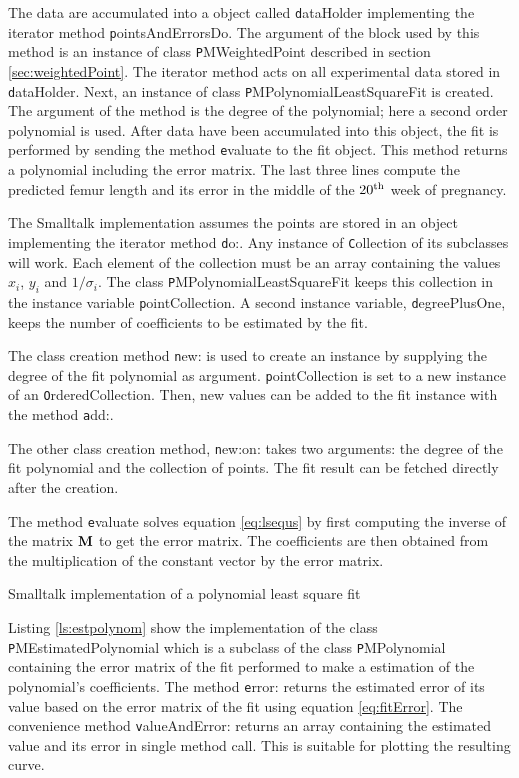 The data are accumulated into a object called {\texttt dataHolder}
implementing the iterator method {\texttt pointsAndErrorsDo}. The
argument of the block used by this method is an instance of class
{\texttt PMWeightedPoint} described in section
\ref{sec:weightedPoint}. The iterator method acts on all
experimental data stored in {\texttt dataHolder}. Next, an instance of
class {\texttt PMPolynomialLeastSquareFit} is created. The argument
of the method is the degree of the polynomial; here a second order
polynomial is used. After data have been accumulated into this
object, the fit is performed by sending the method {\texttt evaluate}
to the fit object. This method returns a polynomial including the
error matrix. The last three lines compute the predicted femur
length and its error in the middle of the $20^{\mathop{\textrm{th}}}$ week of
pregnancy.

The Smalltalk implementation assumes the points are stored in an
object implementing the iterator method {\texttt do:}.
Any instance of
{\texttt Collection} of its subclasses will work. Each element of the
collection must be an array containing the values $x_i$, $y_i$ and
$1/\sigma_i$.
The class {\texttt PMPolynomialLeastSquareFit} keeps
this collection in the instance variable {\texttt pointCollection}. A
second instance variable, {\texttt degreePlusOne}, keeps the number of
coefficients to be estimated by the fit.

The class creation method {\texttt new:} is used to create an instance
by supplying the degree of the fit polynomial as argument. {\texttt
pointCollection} is set to a new instance of an {\texttt
OrderedCollection}. Then, new values can be added to the fit
instance with the method {\texttt add:}.

The other class creation method, {\texttt new:on:} takes two
arguments: the degree of the fit polynomial and the collection of
points. The fit result can be fetched directly after the creation.

The method {\texttt evaluate} solves equation \ref{eq:lsequs} by first
computing the inverse of the matrix ${\textbf M}$ to get the error
matrix. The coefficients are then obtained from the multiplication
of the constant vector by the error matrix.
\begin{listing} Smalltalk implementation of a polynomial least square fit \label{ls:lspolynom}

\end{listing}

Listing \ref{ls:estpolynom} show the implementation of the class
{\texttt PMEstimatedPolynomial} which is a subclass of the class {\texttt PMPolynomial} containing the error matrix of the fit performed to
make a estimation of the polynomial's coefficients. The method
{\texttt error:} returns the estimated error of its value based on the
error matrix of the fit using equation \ref{eq:fitError}. The
convenience method {\texttt valueAndError:} returns an array
containing the estimated value and its error in single method
call. This is suitable for plotting the resulting curve.

